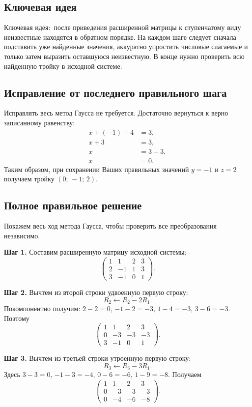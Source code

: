 \documentclass[12pt,a4paper]{article}
\newcommand{\keyidea}{\textcolor{blue!60!black}{Ключевая идея:}}
\begin{document}
\subsection*{Ключевая идея}
\keyidea\ после приведения расширенной матрицы к ступенчатому виду неизвестные находятся в обратном порядке. На каждом шаге следует сначала подставить уже найденные значения, аккуратно упростить числовые слагаемые и только затем выразить оставшуюся неизвестную. В конце нужно проверить всю найденную тройку в исходной системе.

\subsection*{Исправление от последнего правильного шага}
Исправлять весь метод Гаусса не требуется. Достаточно вернуться к верно записанному равенству:
\begin{align*}
x+(-1)+4&=3,\\
x+3&=3,\\
x&=3-3,\\
x&=\boxed{0}.
\end{align*}
Таким образом, при сохранении Ваших правильных значений $y=-1$ и $z=2$ получаем тройку $(0;\,-1;\,2)$.

\subsection*{Полное правильное решение}
Покажем весь ход метода Гаусса, чтобы проверить все преобразования независимо.

\textbf{Шаг 1.} Составим расширенную матрицу исходной системы:
\[
\left(\begin{array}{rrr|r}
1&1&2&3\\ 2&-1&1&3\\ 3&-1&0&1
\end{array}\right).
\]

\textbf{Шаг 2.} Вычтем из второй строки удвоенную первую строку:
\[
R_2\leftarrow R_2-2R_1.
\]
Покомпонентно получим: $2-2=0$, $-1-2=-3$, $1-4=-3$, $3-6=-3$. Поэтому
\[
\left(\begin{array}{rrr|r}
1&1&2&3\\ 0&-3&-3&-3\\ 3&-1&0&1
\end{array}\right).
\]

\textbf{Шаг 3.} Вычтем из третьей строки утроенную первую строку:
\[
R_3\leftarrow R_3-3R_1.
\]
Здесь $3-3=0$, $-1-3=-4$, $0-6=-6$, $1-9=-8$. Получаем
\[
\left(\begin{array}{rrr|r}
1&1&2&3\\ 0&-3&-3&-3\\ 0&-4&-6&-8
\end{array}\right).
\]
\end{document}
